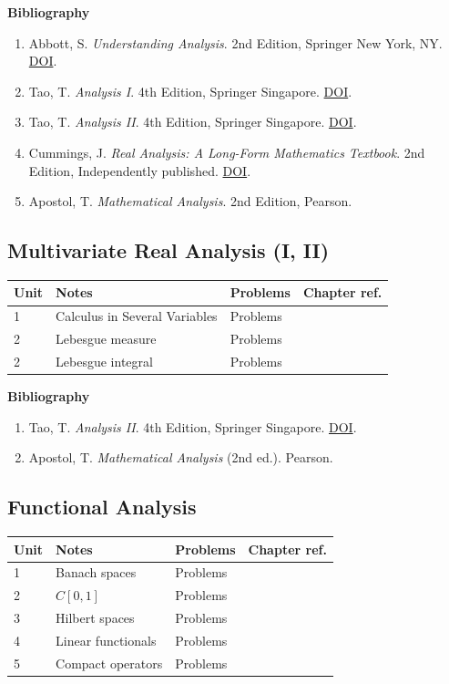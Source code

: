 \textbf{Bibliography}

\begin{enumerate}
  \item Abbott, S. \emph{Understanding Analysis}. 2nd Edition, Springer New York, NY. \href{https://doi.org/10.1007/978-1-4939-2712-8}{DOI}.
  \item Tao, T. \emph{Analysis I}. 4th Edition, Springer Singapore. \href{https://doi.org/10.1007/978-981-19-7261-4}{DOI}.
  \item Tao, T. \emph{Analysis II}. 4th Edition, Springer Singapore. \href{https://doi.org/10.1007/978-981-19-7284-3}{DOI}.
  \item Cummings, J. \emph{Real Analysis: A Long-Form Mathematics Textbook}. 2nd Edition, Independently published. \href{https://longformmath.com/analysis-home}{DOI}.
  \item Apostol, T. \emph{Mathematical Analysis}. 2nd Edition, Pearson.
\end{enumerate}

\subsection*{Multivariate Real Analysis (I, II)}

\begin{tabular}{llll}
  \hline
  Unit & Notes & Problems & Chapter ref. \\
  \hline
  1 & Calculus in Several Variables & Problems & \\
  2 & Lebesgue measure & Problems & \\
  2 & Lebesgue integral & Problems & \\
  \hline
\end{tabular}

\textbf{Bibliography}

\begin{enumerate}
  \item Tao, T. \emph{Analysis II}. 4th Edition, Springer Singapore. \href{https://doi.org/10.1007/978-981-19-7284-3}{DOI}.
  \item Apostol, T. \emph{Mathematical Analysis} (2nd ed.). Pearson.
\end{enumerate}

\subsection*{Functional Analysis}

\begin{tabular}{llll}
  \hline
  Unit & Notes & Problems & Chapter ref. \\
  \hline
  1 & Banach spaces & Problems & \\
  2 & $C[0,1]$ & Problems & \\
  3 & Hilbert spaces & Problems & \\
  4 & Linear functionals & Problems & \\
  5 & Compact operators & Problems & \\
  \hline
\end{tabular}

